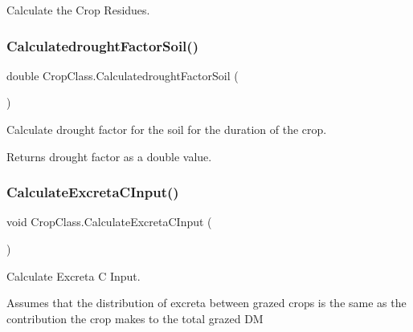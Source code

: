 Calculate the Crop Residues. 

\mbox{\label{class_crop_class_a49c2ae9676cb0ef0a7127cfcafe404a6}} 
\subsubsection{\texorpdfstring{CalculatedroughtFactorSoil()}{CalculatedroughtFactorSoil()}}
{\footnotesize\ttfamily double Crop\+Class.\+Calculatedrought\+Factor\+Soil (\begin{DoxyParamCaption}{ }\end{DoxyParamCaption})\hspace{0.3cm}{\ttfamily [inline]}}



Calculate drought factor for the soil for the duration of the crop. 

\begin{DoxyReturn}{Returns}
drought factor as a double value. 
\end{DoxyReturn}
\mbox{\label{class_crop_class_aa846428c46858858c7eda67db3cbbb0b}} 
\subsubsection{\texorpdfstring{CalculateExcretaCInput()}{CalculateExcretaCInput()}}
{\footnotesize\ttfamily void Crop\+Class.\+Calculate\+Excreta\+C\+Input (\begin{DoxyParamCaption}{ }\end{DoxyParamCaption})\hspace{0.3cm}{\ttfamily [inline]}}



Calculate Excreta C Input. 

Assumes that the distribution of excreta between grazed crops is the same as the contribution the crop makes to the total grazed DM \mbox{\label{class_crop_class_acd893cea7f299839620d4e0556b36cc8}} 
